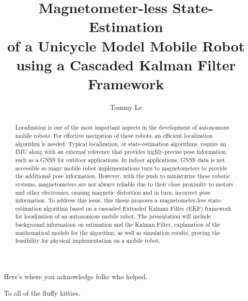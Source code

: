 \documentclass[12pt]{niuthesis}
\begin{document}
\title{Magnetometer-less State-Estimation \\ of a Unicycle Model Mobile
Robot \\ using a Cascaded Kalman Filter Framework}

\author{Tommy Le}


\begin{abstract}
Localization is one of the most important aspects in the development of  
autonomous mobile robots. For effective navigation of these robots, 
an efficient localization algorithm is needed. Typical localization, or
state-estimation algorithms, require an IMU along with an external reference 
that provides highly-precise pose information, such as a GNSS for outdoor 
applications. In indoor applications, GNSS data is not accessible so many 
mobile robot implementations turn to magnetometers to provide the additional pose 
information. However, with the push to miniaturize these robotic systems, 
magnetometers are not always reliable due to their close proximity to motors and 
other electronics, causing magnetic distortion and in turn, incorrect pose 
information. To address this issue, this thesis proposes a magnetometer-less 
state-estimation algorithm based on a cascaded Extended Kalman Filter (EKF) framework 
for localization of an autonomous mobile robot. The presentation will include 
background information on estimation and the Kalman Filter, explanation of the
mathematical models for the algorithm, as well as simulation results, proving 
the feasibility for physical implementation on a mobile robot. 
\end{abstract}

\begin{acknowledgments}
  Here's where you acknowledge folks who helped.

\end{acknowledgments}

\begin{dedication}
  To all of the fluffy kitties.

\end{dedication}

\MakeThesisPrologue %



\appendix
\end{document}
